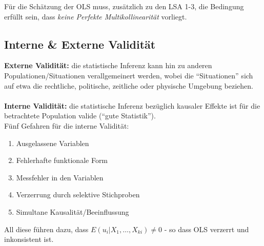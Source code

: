 Für die Schätzung der OLS muss, zusätzlich zu den LSA 1-3, die Bedingung erfüllt
sein, dass \emph{keine Perfekte Multikollinearität} vorliegt.

\subsection{Interne \& Externe Validität}
\label{sec:interne_&_externe_validitat}

{\bfseries Externe Validität:} die statistische Inferenz kann hin zu anderen
Populationen/Situationen verallgemeinert werden, wobei die “Situationen” sich
auf etwa die rechtliche, politische, zeitliche oder physische Umgebung
beziehen.\\\\
{\bfseries Interne Validität:} die statistische Inferenz bezüglich kausaler Effekte ist für
die betrachtete Population valide (“gute Statistik”).\\
Fünf Gefahren für die interne Validität:\\
\begin{enumerate}
    \item Ausgelassene Variablen
    	\item Fehlerhafte funktionale Form
    	\item Messfehler in den Variablen
    	\item Verzerrung durch selektive Stichproben
    	\item Simultane Kausalität/Beeinflussung
\end{enumerate}
All diese führen dazu, dass $E(u_i|X_1, \ldots, X_{ki}) \neq 0$ - so dass OLS
verzerrt und inkonsistent ist.\marginnote{[Folie 7-4]}


